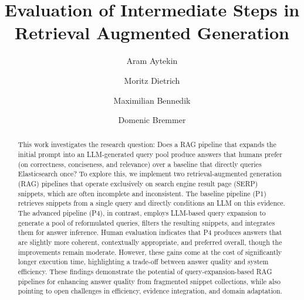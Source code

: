 \documentclass[manuscript,screen]{acmart}
\begin{document}
\title{Evaluation of Intermediate Steps in Retrieval Augmented Generation}

\author{Aram Aytekin}

\author{Moritz Dietrich}

\author{Maximilian Bennedik}

\author{Domenic Bremmer}


\renewcommand{\shortauthors}{A. Aytekin, M. Dietrich, M. Bennedik, D. Bremmer}

\begin{abstract}
This work investigates the research question: Does a RAG pipeline that expands the initial prompt into an LLM-generated query pool produce answers that humans prefer (on correctness, conciseness, and relevance) over a baseline that directly queries Elasticsearch once? To explore this, we implement two retrieval-augmented generation (RAG) pipelines that operate exclusively on search engine result page (SERP) snippets, which are often incomplete and inconsistent. The baseline pipeline (P1) retrieves snippets from a single query and directly conditions an LLM on this evidence. The advanced pipeline (P4), in contrast, employs LLM-based query expansion to generate a pool of reformulated queries, filters the resulting snippets, and integrates them for answer inference. Human evaluation indicates that P4 produces answers that are slightly more coherent, contextually appropriate, and preferred overall, though the improvements remain moderate. However, these gains come at the cost of significantly longer execution time, highlighting a trade-off between answer quality and system efficiency. These findings demonstrate the potential of query-expansion-based RAG pipelines for enhancing answer quality from fragmented snippet collections, while also pointing to open challenges in efficiency, evidence integration, and domain adaptation.
\end{abstract}
\end{document}
